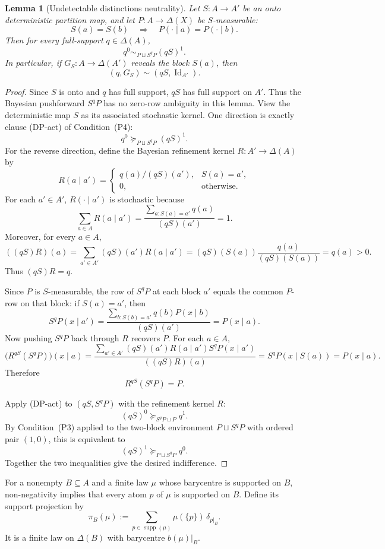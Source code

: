 \documentclass[11pt,a4paper]{article}
\newtheorem{lemma}[theorem]{Lemma}
\theoremstyle{definition}
\newcommand{\Id}{\operatorname{Id}}
\newcommand{\1}{\mathbf 1}
\begin{document}
\begin{lemma}[Undetectable distinctions neutrality]\label{pt:lem:neutrality}
Let $S:A\to A'$ be an onto deterministic partition map, and let $P:A\to\Delta(X)$ be $S$-measurable:
\[
S(a)=S(b)\quad\Rightarrow\quad P(\cdot\mid a)=P(\cdot\mid b).
\]
Then for every full-support $q\in\Delta(A)$,
\[
q^0\sim_{P\sqcup S^qP}(qS)^1.
\]
In particular, if $G_S:A\to\Delta(A')$ reveals the block $S(a)$, then
\[
(q,G_S)\sim(qS,\Id_{A'}).
\]
\end{lemma}

\begin{proof}
Since $S$ is onto and $q$ has full support, $qS$ has full support on $A'$.  Thus the Bayesian pushforward $S^qP$ has no
zero-row ambiguity in this lemma.  View the deterministic map $S$ as its associated stochastic kernel.
One direction is exactly clause \textup{(DP-act)} of Condition~\textup{(P4)}:
\[
q^0\succeq_{P\sqcup S^qP}(qS)^1.
\]
For the reverse direction, define the Bayesian refinement kernel $R:A'\to\Delta(A)$ by
\[
R(a\mid a')=
\begin{cases}
q(a)/(qS)(a'),&S(a)=a',\\
0,&\text{otherwise}.
\end{cases}
\]
For each $a'\in A'$, $R(\cdot\mid a')$ is stochastic because
\[
\sum_{a\in A}R(a\mid a')
=
\frac{\sum_{a:S(a)=a'}q(a)}{(qS)(a')}
=1.
\]
Moreover, for every $a\in A$,
\[
((qS)R)(a)
=
\sum_{a'\in A'}(qS)(a')R(a\mid a')
=
(qS)(S(a))\frac{q(a)}{(qS)(S(a))}
=q(a)>0.
\]
Thus $(qS)R=q$.

Since $P$ is $S$-measurable, the row of $S^qP$ at each block $a'$ equals the common $P$-row on that block: if $S(a)=a'$,
then
\[
S^qP(x\mid a')
=
\frac{\sum_{b:S(b)=a'}q(b)P(x\mid b)}{(qS)(a')}
=
P(x\mid a).
\]
Now pushing $S^qP$ back through $R$ recovers $P$.  For each $a\in A$,
\[
\bigl(R^{qS}(S^qP)\bigr)(x\mid a)
=
\frac{\sum_{a'\in A'}(qS)(a')R(a\mid a')S^qP(x\mid a')}{((qS)R)(a)}
=
S^qP(x\mid S(a))
=
P(x\mid a).
\]
Therefore
\[
R^{qS}(S^qP)=P.
\]

Apply \textup{(DP-act)} to $(qS,S^qP)$ with the refinement kernel $R$:
\[
(qS)^0\succeq_{S^qP\sqcup P}q^1.
\]
By Condition~\textup{(P3)} applied to the two-block environment $P\sqcup S^qP$ with ordered pair $(1,0)$, this is equivalent
to
\[
(qS)^1\succeq_{P\sqcup S^qP}q^0.
\]
Together the two inequalities give the desired indifference.
\end{proof}

For a nonempty $B\subseteq A$ and a finite law $\mu$ whose barycentre is supported on $B$, non-negativity implies that
every atom $p$ of $\mu$ is supported on $B$.  Define its support projection by
\[
\pi_B(\mu)
:=
\sum_{p\in\operatorname{supp}(\mu)}\mu(\{p\})\,\delta_{p|_B}.
\]
It is a finite law on $\Delta(B)$ with barycentre $b(\mu)|_B$.
\end{document}
